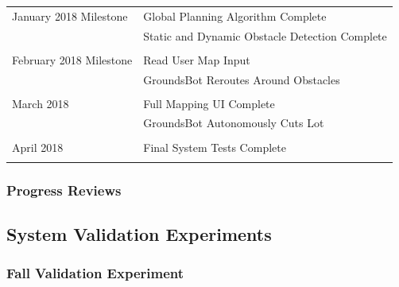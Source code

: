 \documentclass[12pt]{extarticle}
\begin{document}
\begin{table}[H]
\begin{tabular}{ll}
January 2018 Milestone 

    &Global Planning Algorithm Complete          \\
    &Static and Dynamic Obstacle Detection Complete\\
                                               \\
February 2018 Milestone 
  
    &Read User Map Input                        \\
    &GroundsBot Reroutes Around Obstacles       \\
                                              \\
March 2018 
  
    &Full Mapping UI Complete                   \\
    &GroundsBot Autonomously Cuts Lot           \\
                                              \\
April 2018 

    &Final System Tests Complete                \\                                            \\
\end{tabular}

\end{table}

\subsubsection{Progress Reviews}

\subsection{System Validation Experiments}
\subsubsection{Fall Validation Experiment}
\end{document}
